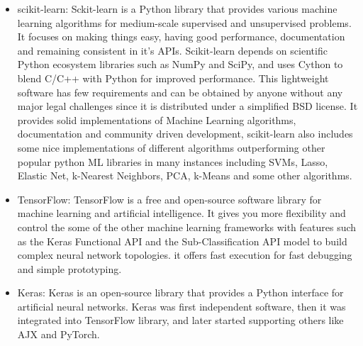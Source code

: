 \begin{itemize}
	\item scikit-learn: Sckit-learn is a Python library that provides various machine learning algorithms for medium-scale supervised and unsupervised problems. It focuses on making things easy, having good performance, documentation and remaining consistent in it's APIs. Scikit-learn depends on scientific Python ecosystem libraries such as NumPy and SciPy, and uses Cython to blend C/C++ with Python for improved performance. This lightweight software has few requirements and can be obtained by anyone without any major legal challenges since it is distributed under a simplified BSD license. It provides solid implementations of Machine Learning algorithms, documentation and community driven development, scikit-learn also includes some nice implementations of different algorithms outperforming other popular python ML libraries in many instances including SVMs, Lasso, Elastic Net, k-Nearest Neighbors, PCA, k-Means and some other algorithms.\cite{scikit-learn}


	\item TensorFlow: TensorFlow is a free and open-source software library for machine learning and artificial intelligence. It gives you more flexibility and control the some of the other machine learning frameworks with features such as the Keras Functional API and the Sub-Classification API model to build complex neural network topologies. it offers fast execution for fast debugging and simple prototyping.\cite{tf}
	

	\item Keras: Keras is an open-source library that provides a Python interface for artificial neural networks. Keras was first independent software, then it was integrated into TensorFlow library, and later started supporting others like AJX and PyTorch.\cite{keras}




	

\end{itemize}






